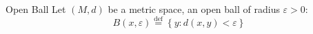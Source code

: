 \documentclass{standalone}
\begin{document}
\begin{defn*}{Open Ball}
Let $\left( M, d \right)$ be a metric space, an open ball of radius $\varepsilon > 0$: 
\[
	B\left(x,\varepsilon\right)\stackrel{\text{def}}{=} \left\{ y: d\left(x,y\right)< \varepsilon \right\}
\]
\end{defn*}
\end{document}
